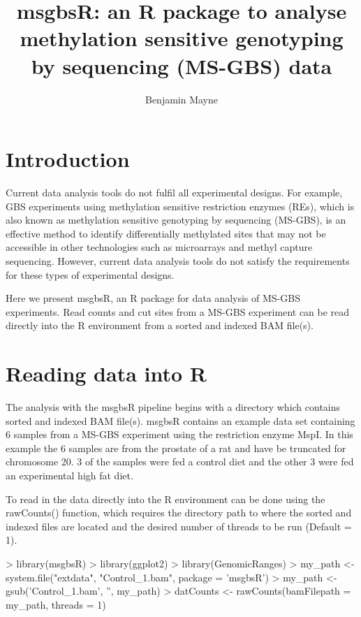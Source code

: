 \documentclass{article}
\begin{document}


\title{msgbsR: an R package to analyse methylation sensitive genotyping by sequencing (MS-GBS) data}
\author{Benjamin Mayne}
\maketitle

\tableofcontents

\clearpage

\section{Introduction}

Current data analysis tools do not fulfil all experimental designs. For example, GBS experiments using methylation sensitive restriction enzymes (REs), which is also known as methylation sensitive genotyping by sequencing (MS-GBS), is an effective method to identify differentially methylated sites that may not be accessible in other technologies such as microarrays and methyl capture sequencing. However, current data analysis tools do not satisfy the requirements for these types of experimental designs.

Here we present msgbsR, an R package for data analysis of MS-GBS experiments. Read counts and cut sites from a MS-GBS experiment can be read directly into the R environment from a sorted and indexed BAM file(s).

\section{Reading data into R}

The analysis with the msgbsR pipeline begins with a directory which contains sorted and indexed BAM file(s). msgbsR contains an example data set containing 6 samples from a MS-GBS experiment using the restriction enzyme MspI. In this example the 6 samples are from the prostate of a rat and have be truncated for chromosome 20. 3 of the samples were fed a control diet and the other 3 were fed an experimental high fat diet.

To read in the data directly into the R environment can be done using the rawCounts() function, which requires the directory path to where the sorted and indexed files are located and the desired number of threads to be run (Default = 1).

\begin{Schunk}
\begin{Sinput}
> library(msgbsR)
> library(ggplot2)
> library(GenomicRanges)
> my_path <- system.file("extdata", "Control_1.bam", package = 'msgbsR')
> my_path <- gsub('Control_1.bam', '', my_path)
> datCounts <- rawCounts(bamFilepath = my_path, threads = 1)
\end{Sinput}
\end{Schunk}
\end{document}
